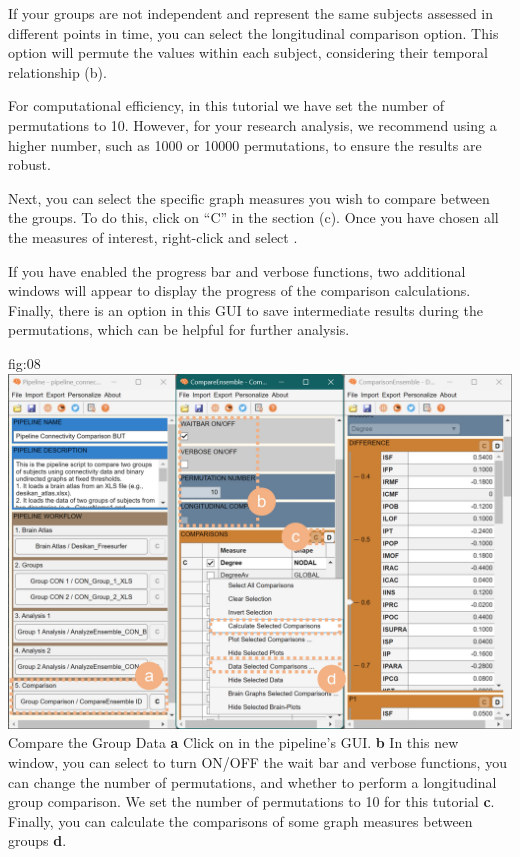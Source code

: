 \documentclass[justified]{tufte-handout}
\begin{document}
If your groups are not independent and represent the same subjects assessed in different points in time, you can select the longitudinal comparison option. This option will permute the values within each subject, considering their temporal relationship (b).

For computational efficiency, in this tutorial we have set the number of permutations to 10. However, for your research analysis, we recommend using a higher number, such as 1000 or 10000 permutations, to ensure the results are robust.

Next, you can select the specific graph measures you wish to compare between the groups. To do this, click on “C” in the  section (c). Once you have chosen all the measures of interest, right-click and select .

If you have enabled the progress bar and verbose functions, two additional windows will appear to display the progress of the comparison calculations. Finally, there is an option in this GUI to save intermediate results during the permutations, which can be helpful for further analysis.

	{fig:08}
	{
	\includegraphics{fig08.jpg}
	}
	{Compare the Group Data}
	{
	{\bf a} Click on  in the pipeline's GUI.
	{\bf b} In this new window, you can select to turn ON/OFF the wait bar and verbose functions, you can change the number of permutations, and whether to perform a longitudinal group comparison. We set the number of permutations to 10 for this tutorial {\bf c}. Finally, you can calculate the comparisons of some graph measures between groups {\bf d}.
	}
 
\end{document}
